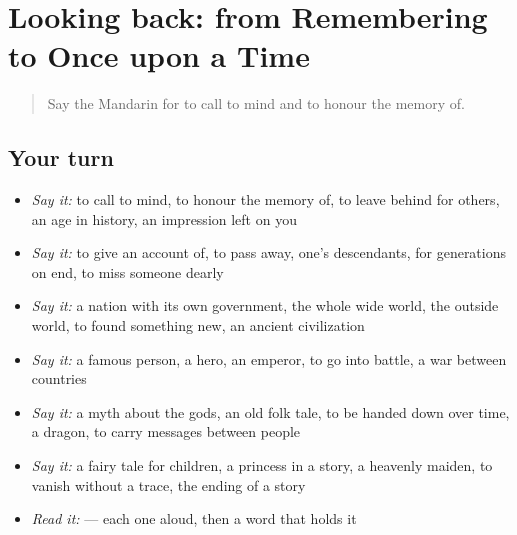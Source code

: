 \section[(dialogue)]{Looking back: from Remembering to Once upon a Time}

\label{lesson:ZH-R329-review-324-329}



\begin{quote}
Say the Mandarin for to call to mind and to honour the memory of.
\end{quote}

\subsection*{Your turn}
\begin{itemize}
\raggedright
  \item \emph{Say it:} to call to mind, to honour the memory of, to leave behind for others, an age in history, an impression left on you
  \item \emph{Say it:} to give an account of, to pass away, one's descendants, for generations on end, to miss someone dearly
  \item \emph{Say it:} a nation with its own government, the whole wide world, the outside world, to found something new, an ancient civilization
  \item \emph{Say it:} a famous person, a hero, an emperor, to go into battle, a war between countries
  \item \emph{Say it:} a myth about the gods, an old folk tale, to be handed down over time, a dragon, to carry messages between people
  \item \emph{Say it:} a fairy tale for children, a princess in a story, a heavenly maiden, to vanish without a trace, the ending of a story
  \item \emph{Read it:}    — each one aloud, then a word that holds it
\end{itemize}

